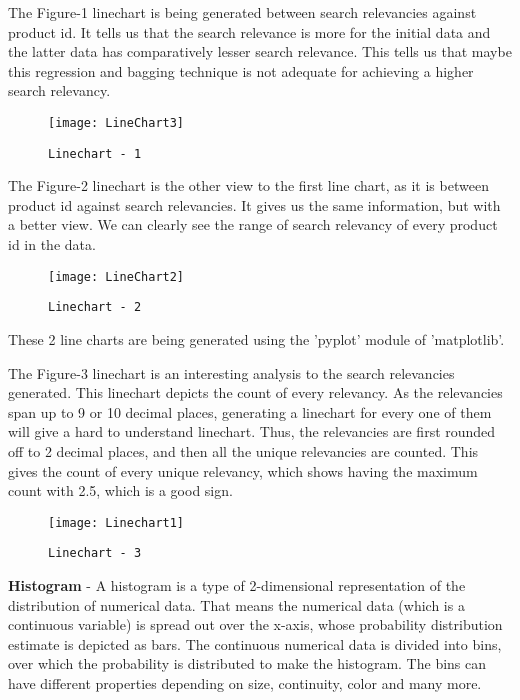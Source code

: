 \documentclass{sig-alternate-05-2015}
\begin{document}
The Figure-1 linechart is being generated between search relevancies against product id. It tells us that the search relevance is more for the initial data and the latter data has comparatively lesser search relevance. This tells us that maybe this regression and bagging technique is not adequate for achieving a higher search relevancy.

\begin{figure}
\centering
\texttt{[image: LineChart3]}
\caption{\texttt{Linechart - 1}}
\end{figure}

The Figure-2 linechart is the other view to the first line chart, as it is between product id against search relevancies. It gives us the same information, but with a better view. We can clearly see the range of search relevancy of every product id in the data.

\begin{figure}
\centering
\texttt{[image: LineChart2]}
\caption{\texttt{Linechart - 2}}
\end{figure}

These 2 line charts are being generated using the 'pyplot' module of 'matplotlib'.


The Figure-3 linechart is an interesting analysis to the search relevancies generated. This linechart depicts the count of every relevancy. As the relevancies span up to 9 or 10 decimal places, generating a linechart for every one of them will give a hard to understand linechart. Thus, the relevancies are first rounded off to 2 decimal places, and then all the unique relevancies are counted. This gives the count of every unique relevancy, which shows having the maximum count with 2.5, which is a good sign.\\

\begin{figure}
\centering
\texttt{[image: Linechart1]}
\caption{\texttt{Linechart - 3}}
\end{figure}


\textbf{Histogram} - A histogram is a type of 2-dimensional representation of the distribution of numerical data. That means the numerical data (which is a continuous variable) is spread out over the x-axis, whose probability distribution estimate is depicted as bars. The continuous numerical data is divided into bins, over which the probability is distributed to make the histogram. The bins can have different properties depending on size, continuity, color and many more. \cite{www-wikiHisto}
\end{document}
